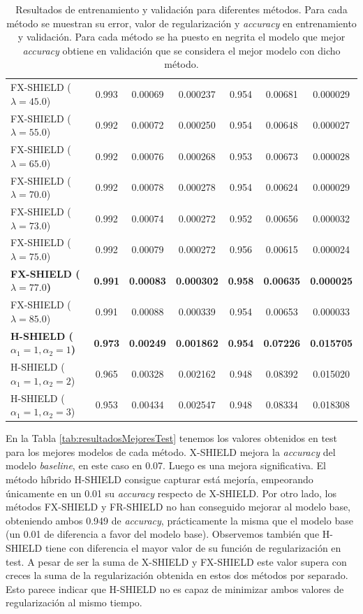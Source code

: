 \begin{table}[htbp]
\begin{tabular}{|l|cccccc|}
\rowcolor{gray!10} FX-SHIELD ($\lambda = 45.0$) & 0.993 & 0.00069 & 0.000237 & 0.954 & 0.00681 & 0.000029 \\
\rowcolor{gray!10} FX-SHIELD ($\lambda = 55.0$) & 0.992 & 0.00072 & 0.000250 & 0.954 & 0.00648 & 0.000027 \\
\rowcolor{gray!10} FX-SHIELD ($\lambda = 65.0$) & 0.992 & 0.00076 & 0.000268 & 0.953 & 0.00673 & 0.000028 \\
\rowcolor{gray!10} FX-SHIELD ($\lambda = 70.0$) & 0.992 & 0.00078 & 0.000278 & 0.954 & 0.00624 & 0.000029 \\
\rowcolor{gray!10} FX-SHIELD ($\lambda = 73.0$) & 0.992 & 0.00074 & 0.000272 & 0.952 & 0.00656 & 0.000032 \\
\rowcolor{gray!10} FX-SHIELD ($\lambda = 75.0$) & 0.992 & 0.00079 & 0.000272 & 0.956 & 0.00615 & 0.000024 \\
\rowcolor{gray!10} \textbf{FX-SHIELD ($\lambda = 77.0$)} & \textbf{0.991} & \textbf{0.00083} & \textbf{0.000302} & \textbf{0.958} & \textbf{0.00635} & \textbf{0.000025} \\
\rowcolor{gray!10} FX-SHIELD ($\lambda = 85.0$) & 0.991 & 0.00088 & 0.000339 & 0.954 & 0.00653 & 0.000033 \\
\hline
\textbf{H-SHIELD ($\alpha_1=1, \alpha_2=1$)} & \textbf{0.973} & \textbf{0.00249} & \textbf{0.001862} & \textbf{0.954} & \textbf{0.07226} & \textbf{0.015705} \\
H-SHIELD ($\alpha_1=1, \alpha_2=2$) & 0.965 & 0.00328 & 0.002162 & 0.948 & 0.08392 & 0.015020 \\
H-SHIELD ($\alpha_1=1, \alpha_2=3$) & 0.953 & 0.00434 & 0.002547 & 0.948 & 0.08334 & 0.018308 \\
\hline


\end{tabular}
\caption{Resultados de entrenamiento y validación para diferentes métodos. Para cada método se muestran su error, valor de regularización y \textit{accuracy} en entrenamiento y validación. Para cada método se ha puesto en negrita el modelo que mejor \textit{accuracy} obtiene en validación que se considera el mejor modelo con dicho método.}
\label{tab:resultadosTodo}
\end{table}

\newpage
En la Tabla \ref{tab:resultadosMejoresTest} tenemos los valores obtenidos en test para los mejores modelos de cada método. X-SHIELD mejora la \textit{accuracy} del modelo \textit{baseline}, en este caso en 0.07. Luego es una mejora significativa. El método híbrido H-SHIELD consigue capturar está mejoría, empeorando únicamente en un 0.01 su \textit{accuracy} respecto de X-SHIELD. Por otro lado, los métodos FX-SHIELD y FR-SHIELD no han conseguido mejorar al modelo base, obteniendo ambos 0.949 de \textit{accuracy}, prácticamente la misma que el modelo base (un 0.01 de diferencia a favor del modelo base). Observemos también que H-SHIELD tiene con diferencia el mayor valor de su función de regularización en test. A pesar de ser la suma de X-SHIELD y FX-SHIELD este valor supera con creces la suma de la regularización obtenida en estos dos métodos por separado. Esto parece indicar que H-SHIELD no es capaz de minimizar ambos valores de regularización al mismo tiempo.

